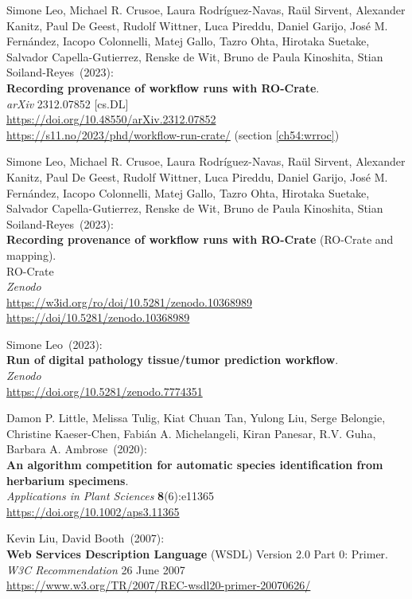 \begin{thebibliography}{9}
Simone Leo, Michael R. Crusoe, Laura Rodríguez-Navas, Raül Sirvent, Alexander Kanitz, Paul De Geest, Rudolf Wittner, Luca Pireddu, Daniel Garijo, José M. Fernández, Iacopo Colonnelli, Matej Gallo, Tazro Ohta, Hirotaka Suetake, Salvador Capella-Gutierrez, Renske de Wit, Bruno de Paula Kinoshita, Stian Soiland-Reyes~(2023): \\
\textbf{Recording provenance of workflow runs with RO-Crate}.\\
\emph{arXiv} 2312.07852 [cs.DL] \\
\url{https://doi.org/10.48550/arXiv.2312.07852}\\
\url{https://s11.no/2023/phd/workflow-run-crate/} 
(section \vref{ch54:wrroc})

Simone Leo, Michael R. Crusoe, Laura Rodríguez-Navas, Raül Sirvent, Alexander Kanitz, Paul De Geest, Rudolf Wittner, Luca Pireddu, Daniel Garijo, José M. Fernández, Iacopo Colonnelli, Matej Gallo, Tazro Ohta, Hirotaka Suetake, Salvador Capella-Gutierrez, Renske de Wit, Bruno de Paula Kinoshita, Stian Soiland-Reyes~(2023): \\
\textbf{Recording provenance of workflow runs with RO-Crate} (RO-Crate and mapping).\\
RO-Crate\\
\emph{Zenodo}\\
\url{https://w3id.org/ro/doi/10.5281/zenodo.10368989}\\
\url{https://doi/10.5281/zenodo.10368989}


Simone Leo~(2023): \\
\textbf{Run of digital pathology tissue/tumor prediction workflow}.\\
\emph{Zenodo}\\
\url{https://doi.org/10.5281/zenodo.7774351}

Damon P. Little, Melissa Tulig, Kiat Chuan Tan, Yulong Liu, Serge Belongie, Christine Kaeser‐Chen, Fabián A. Michelangeli, Kiran Panesar, R.V. Guha, Barbara A. Ambrose~(2020): \\
\textbf{An algorithm competition for automatic species identification from herbarium specimens}.\\
\emph{Applications in Plant Sciences} \textbf{8}(6):e11365\\
\url{https://doi.org/10.1002/aps3.11365}

Kevin Liu, David Booth~(2007): \\
\textbf{Web Services Description Language} (WSDL) Version 2.0
Part 0: Primer. \\
\emph{W3C Recommendation} 26 June 2007 \\
\url{https://www.w3.org/TR/2007/REC-wsdl20-primer-20070626/}


\end{thebibliography}
